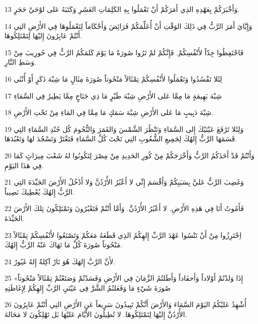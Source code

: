 \par 13 وَأَخْبَرَكُمْ بِعَهْدِهِ الذِي أَمَرَكُمْ أَنْ تَعْمَلُوا بِهِ الكَلِمَاتِ العَشَرِ وَكَتَبَهُ عَلى لوْحَيْ حَجَرٍ.
\par 14 وَإِيَّايَ أَمَرَ الرَّبُّ فِي ذَلِكَ الوَقْتِ أَنْ أُعَلِّمَكُمْ فَرَائِضَ وَأَحْكَاماً لِتَعْمَلُوهَا فِي الأَرْضِ التِي أَنْتُمْ عَابِرُونَ إِليْهَا لِتَمْتَلِكُوهَا.
\par 15 فَاحْتَفِظُوا جِدّاً لأَنْفُسِكُمْ. فَإِنَّكُمْ لمْ تَرُوا صُورَةً مَا يَوْمَ كَلمَكُمُ الرَّبُّ فِي حُورِيبَ مِنْ وَسَطِ النَّارِ.
\par 16 لِئَلا تَفْسُدُوا وَتَعْمَلُوا لأَنْفُسِكُمْ تِمْثَالاً مَنْحُوتاً صُورَةَ مِثَالٍ مَا شِبْهَ ذَكَرٍ أَوْ أُنْثَى
\par 17 شِبْهَ بَهِيمَةٍ مَا مِمَّا عَلى الأَرْضِ شِبْهَ طَيْرٍ مَا ذِي جَنَاحٍ مِمَّا يَطِيرُ فِي السَّمَاءِ
\par 18 شِبْهَ دَبِيبٍ مَا عَلى الأَرْضِ شِبْهَ سَمَكٍ مَا مِمَّا فِي المَاءِ مِنْ تَحْتِ الأَرْضِ.
\par 19 وَلِئَلا تَرْفَعَ عَيْنَيْكَ إِلى السَّمَاءِ وَتَنْظُرَ الشَّمْسَ وَالقَمَرَ وَالنُّجُومَ كُل جُنْدِ السَّمَاءِ التِي قَسَمَهَا الرَّبُّ إِلهُكَ لِجَمِيعِ الشُّعُوبِ التِي تَحْتَ كُلِّ السَّمَاءِ فَتَغْتَرَّ وَتَسْجُدَ لهَا وَتَعْبُدَهَا.
\par 20 وَأَنْتُمْ قَدْ أَخَذَكُمُ الرَّبُّ وَأَخْرَجَكُمْ مِنْ كُورِ الحَدِيدِ مِنْ مِصْرَ لِتَكُونُوا لهُ شَعْبَ مِيرَاثٍ كَمَا فِي هَذَا اليَوْمِ.
\par 21 وَغَضِبَ الرَّبُّ عَليَّ بِسَبَبِكُمْ وَأَقْسَمَ إِنِّي لا أَعْبُرُ الأُرْدُنَّ وَلا أَدْخُلُ الأَرْضَ الجَيِّدَةَ التِي الرَّبُّ إِلهُكَ يُعْطِيكَ نَصِيباً.
\par 22 فَأَمُوتُ أَنَا فِي هَذِهِ الأَرْضِ. لا أَعْبُرُ الأُرْدُنَّ. وَأَمَّا أَنْتُمْ فَتَعْبُرُونَ وَتَمْتَلِكُونَ تِلكَ الأَرْضَ الجَيِّدَةَ.
\par 23 اِحْتَرِزُوا مِنْ أَنْ تَنْسُوا عَهْدَ الرَّبِّ إِلهِكُمُ الذِي قَطَعَهُ مَعَكُمْ وَتَصْنَعُوا لأَنْفُسِكُمْ تِمْثَالاً مَنْحُوتاً صُورَةَ كُلِّ مَا نَهَاكَ عَنْهُ الرَّبُّ إِلهُكَ.
\par 24 لأَنَّ الرَّبَّ إِلهَكَ هُوَ نَارٌ آكِلةٌ إِلهٌ غَيُورٌ.
\par 25 «إِذَا وَلدْتُمْ أَوْلاداً وَأَحفَاداً وَأَطَلتُمُ الزَّمَانَ فِي الأَرْضِ وَفَسَدْتُمْ وَصَنَعْتُمْ تِمْثَالاً مَنْحُوتاً صُورَةَ شَيْءٍ مَا وَفَعَلتُمُ الشَّرَّ فِي عَيْنَيِ الرَّبِّ إِلهِكُمْ لِإِغَاظَتِهِ
\par 26 أُشْهِدُ عَليْكُمُ اليَوْمَ السَّمَاءَ وَالأَرْضَ أَنَّكُمْ تَبِيدُونَ سَرِيعاً عَنِ الأَرْضِ التِي أَنْتُمْ عَابِرُونَ الأُرْدُنَّ إِليْهَا لِتَمْتَلِكُوهَا. لا تُطِيلُونَ الأَيَّامَ عَليْهَا بَل تَهْلِكُونَ لا مَحَالةَ.
